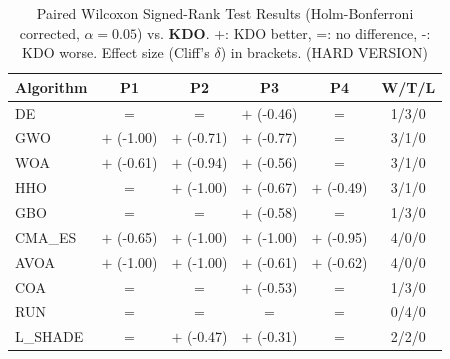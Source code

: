 \begin{table}[htbp]
\centering
\caption{Paired Wilcoxon Signed-Rank Test Results (Holm-Bonferroni corrected, $\alpha=0.05$) vs. \textbf{KDO}. +: KDO better, =: no difference, -: KDO worse. Effect size (Cliff's $\delta$) in brackets. (HARD VERSION)}
\label{tab:wilcoxon_advanced}
\small
\begin{tabular}{lccccc}
\toprule
\textbf{Algorithm} & \textbf{P1} & \textbf{P2} & \textbf{P3} & \textbf{P4} & \textbf{W/T/L} \\
\midrule
DE & $=$ & $=$ & $+$ (-0.46) & $=$ & 1/3/0 \\
GWO & $+$ (-1.00) & $+$ (-0.71) & $+$ (-0.77) & $=$ & 3/1/0 \\
WOA & $+$ (-0.61) & $+$ (-0.94) & $+$ (-0.56) & $=$ & 3/1/0 \\
HHO & $=$ & $+$ (-1.00) & $+$ (-0.67) & $+$ (-0.49) & 3/1/0 \\
GBO & $=$ & $=$ & $+$ (-0.58) & $=$ & 1/3/0 \\
CMA_ES & $+$ (-0.65) & $+$ (-1.00) & $+$ (-1.00) & $+$ (-0.95) & 4/0/0 \\
AVOA & $+$ (-1.00) & $+$ (-1.00) & $+$ (-0.61) & $+$ (-0.62) & 4/0/0 \\
COA & $=$ & $=$ & $+$ (-0.53) & $=$ & 1/3/0 \\
RUN & $=$ & $=$ & $=$ & $=$ & 0/4/0 \\
L_SHADE & $=$ & $+$ (-0.47) & $+$ (-0.31) & $=$ & 2/2/0 \\
\bottomrule
\end{tabular}
\end{table}
